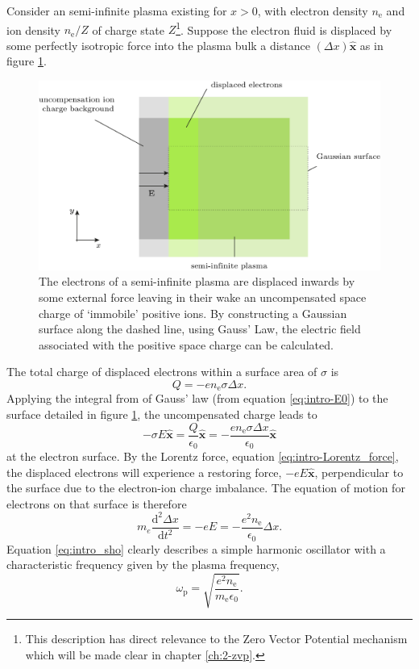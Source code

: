 Consider an semi-infinite plasma existing for $x>0$, with electron density $n_\mathrm{e}$ and ion density $n_\mathrm{e}/Z$ of charge state $Z$\footnote{This description has direct relevance to the Zero Vector Potential mechanism which will be made clear in chapter \ref{ch:2-zvp}.}. Suppose the electron fluid is displaced by some perfectly isotropic force into the plasma bulk a distance $(\Delta x) \hat{\mathbf{x}}$ as in figure \ref{fig:introplasmafrequency}. 
\begin{figure}
	\centering
	\includegraphics[width=0.7\linewidth]{figures/intro/intro_plasma_frequency}
	\caption[Diagram to illustrate the derivation of the plasma frequency.]{The electrons of a semi-infinite plasma are displaced inwards by some external force leaving in their wake an uncompensated space charge of `immobile' positive ions. By constructing a Gaussian surface along the dashed line, using Gauss' Law, the electric field associated with the positive space charge can be calculated.}
	\label{fig:introplasmafrequency}
\end{figure}
The total charge of displaced electrons within a surface area of $\sigma$ is 
\begin{equation}\label{eq:intro_Q}
	Q = -en_\mathrm{e}\sigma\Delta x.
\end{equation}
Applying the integral from of Gauss' law (from equation \ref{eq:intro-E0}) to the surface detailed in figure \ref{fig:introplasmafrequency}, the uncompensated charge leads to 
\begin{equation}\label{eq:intro_E}
	-\sigma E\hat{\mathbf{x}}= \frac{Q}{\epsilon_0}\hat{\mathbf{x}} = -\frac{en_\mathrm{e}\sigma\Delta x}{\epsilon_0}\hat{\mathbf{x}}
\end{equation}
at the electron surface. By the Lorentz force, equation \ref{eq:intro-Lorentz_force}, the displaced electrons will experience a restoring force, $-eE\hat{\mathbf{x}}$, perpendicular to the surface due to the electron-ion charge imbalance. The equation of motion for electrons on that surface is therefore
\begin{equation}\label{eq:intro_sho}
	m_e\frac{\mathrm{d}^2\Delta x}{\mathrm{d}t^2} = -eE = -\frac{e^2n_\mathrm{e}}{\epsilon_0}\Delta x.
\end{equation}
Equation \ref{eq:intro_sho} clearly describes a simple harmonic oscillator with a characteristic frequency given by the plasma frequency,
\begin{equation}
	\omega_\mathrm{p} = \sqrt{\frac{e^2n_\mathrm{e}}{m_\mathrm{e} \epsilon_0}}.
\end{equation}

